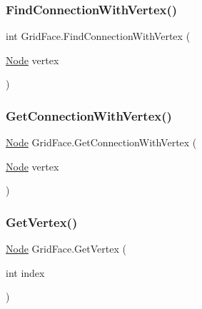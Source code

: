 \mbox{\label{class_grid_face_a4a97d1968f8e31252c109c6a817d4db5}} 
\subsubsection{\texorpdfstring{Find\+Connection\+With\+Vertex()}{FindConnectionWithVertex()}}
{\footnotesize\ttfamily int Grid\+Face.\+Find\+Connection\+With\+Vertex (\begin{DoxyParamCaption}\item[{\mbox{\hyperlink{class_node}{Node}}}]{vertex }\end{DoxyParamCaption})\hspace{0.3cm}{\ttfamily [protected]}}

\mbox{\label{class_grid_face_a19159b9927ce52f293e566975fcd3340}} 
\subsubsection{\texorpdfstring{Get\+Connection\+With\+Vertex()}{GetConnectionWithVertex()}}
{\footnotesize\ttfamily \mbox{\hyperlink{class_node}{Node}} Grid\+Face.\+Get\+Connection\+With\+Vertex (\begin{DoxyParamCaption}\item[{\mbox{\hyperlink{class_node}{Node}}}]{vertex }\end{DoxyParamCaption})}

\mbox{\label{class_grid_face_a153928011211a1740054bf60adf67730}} 
\subsubsection{\texorpdfstring{Get\+Vertex()}{GetVertex()}}
{\footnotesize\ttfamily \mbox{\hyperlink{class_node}{Node}} Grid\+Face.\+Get\+Vertex (\begin{DoxyParamCaption}\item[{int}]{index }\end{DoxyParamCaption})}

